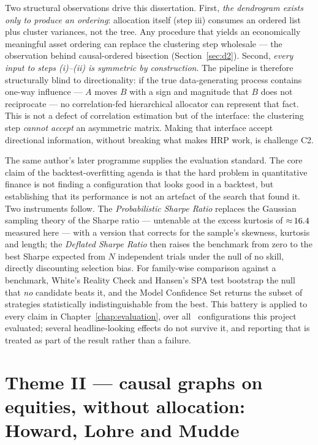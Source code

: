 Two structural observations drive this dissertation. First, \emph{the
dendrogram exists only to produce an ordering}: allocation itself (step iii)
consumes an ordered list plus cluster variances, not the tree. Any procedure
that yields an economically meaningful asset ordering can replace the
clustering step wholesale --- the observation behind causal-ordered bisection
(Section~\ref{sec:d2}). Second, \emph{every input to steps (i)--(ii) is
symmetric by construction}. The pipeline is therefore structurally blind to
directionality: if the true data-generating process contains one-way influence
--- $A$ moves $B$ with a sign and magnitude that $B$ does not reciprocate ---
no correlation-fed hierarchical allocator can represent that fact. This is not
a defect of correlation estimation but of the interface: the clustering step
\emph{cannot accept} an asymmetric matrix. Making that interface accept
directional information, without breaking what makes HRP work, is challenge
C2.

The same author's later programme supplies the evaluation standard. The core
claim of the backtest-overfitting agenda \cite{bailey2014deflated,
lopezdeprado2023causal} is that the hard problem in quantitative finance is
not finding a configuration that looks good in a backtest, but establishing
that its performance is not an artefact of the search that found it. Two
instruments follow. The \emph{Probabilistic Sharpe Ratio} \cite{bailey2012psr}
replaces the Gaussian sampling theory of the Sharpe ratio --- untenable at the
excess kurtosis of ${\approx}\,16.4$ measured here --- with a version
that corrects for the sample's skewness, kurtosis and length; the
\emph{Deflated Sharpe Ratio} \cite{bailey2014deflated} then raises the
benchmark from zero to the best Sharpe expected from $N$ independent trials
under the null of no skill, directly discounting selection bias. For
family-wise comparison against a benchmark, White's Reality Check
\cite{white2000reality} and Hansen's SPA test \cite{hansen2005spa} bootstrap
the null that \emph{no} candidate beats it, and the Model Confidence Set
\cite{hansen2011mcs} returns the subset of strategies statistically
indistinguishable from the best. This battery is applied to every claim in
Chapter~\ref{chap:evaluation}, over all \rsNtrials\ configurations this
project evaluated; several headline-looking effects do not survive it, and
reporting that is treated as part of the result rather than a failure.

\section{Theme II --- causal graphs on equities, without allocation:
Howard, Lohre and Mudde}
\label{sec:howard-theme}

